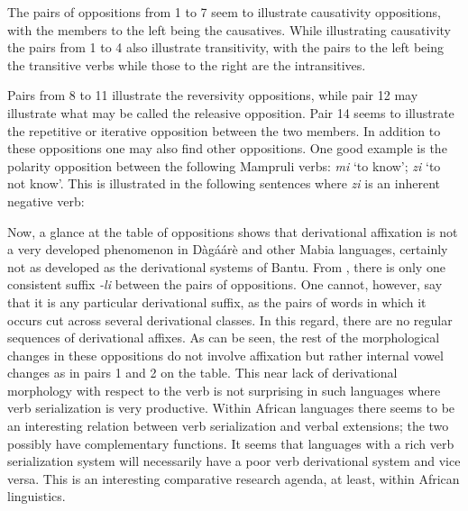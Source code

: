 The pairs of oppositions from 1 to 7 seem to illustrate causativity oppositions, with the
members to the left being the causatives.
While illustrating causativity the pairs from 1 to 4 also illustrate transitivity, with the
pairs to the left being the transitive verbs while those to the right are the intransitives.

Pairs from 8 to 11 illustrate the reversivity oppositions, while pair 12 may
illustrate what may be called the releasive opposition. Pair 14 seems to illustrate the repetitive
or iterative opposition between the two members.
In addition to these oppositions one may also find other oppositions. One good
example is the polarity opposition between the following Mampruli verbs: \textit{mi} ‘to know’; \textit{zi}
‘to not know’. This is illustrated in the following sentences where \textit{zi} is an inherent negative
verb:

\ea {}
\z\z



Now, a glance at the table of oppositions shows that derivational affixation is not a
very developed phenomenon in Dàgáárè and other Mabia languages, certainly not as
developed as the derivational systems of Bantu. From , there is only one
consistent suffix \textit{-li} between the pairs of oppositions. One cannot, however, say that it is any
particular derivational suffix, as the pairs of words in which it occurs cut across several
derivational classes. In this regard, there are no regular sequences of derivational affixes. As
can be seen, the rest of the morphological changes in these oppositions do not involve
affixation but rather internal vowel changes as in pairs 1 and 2 on the table.
This near lack of derivational morphology with respect to the verb is not surprising in
such languages where verb serialization is very productive. Within African languages there seems to be an interesting relation between verb serialization and verbal extensions; the
two possibly have complementary functions. It seems that languages with a rich verb
serialization system will necessarily have a poor verb derivational system and vice versa. This
is an interesting comparative research agenda, at least, within African linguistics.

